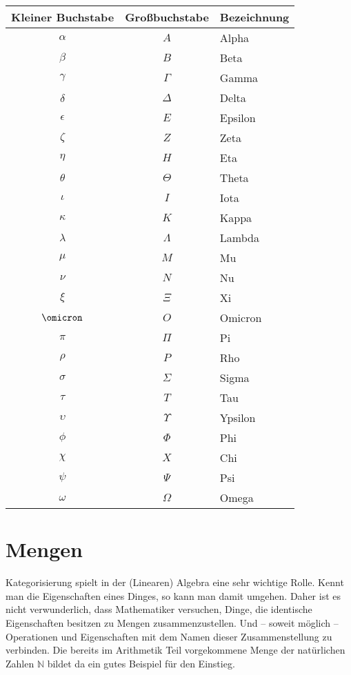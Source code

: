 \begin{center}
\begin{tabular}{c|c|l}
\hline
\textbf{Kleiner Buchstabe} & \textbf{Großbuchstabe} & \textbf{Bezeichnung} \\
\hline
$\alpha $ & $A $ & Alpha \\
$\beta $ & $B $ & Beta \\
$\gamma $ & $\Gamma $ & Gamma \\
$\delta $ & $\Delta $ & Delta \\
$\epsilon $ & $E $ & Epsilon \\
$\zeta $ & $Z $ & Zeta \\
$\eta $ & $H $ &  Eta\\
$\theta $ & $\Theta $ & Theta \\
$\iota $ & $I $ & Iota \\
$\kappa $ & $K $ & Kappa \\
$\lambda $ & $\Lambda $ & Lambda \\
$\mu $ & $M $ & Mu \\
$\nu $ & $N $ & Nu \\
$\xi $ & $\Xi $ &  Xi \\
$\omicron $ & $O $ & Omicron \\
$\pi $ & $\Pi $ & Pi \\
$\rho $ & $P $ & Rho \\
$\sigma $ & $\Sigma $ & Sigma  \\
$\tau $ & $T $ & Tau \\
$\upsilon $ & $\Upsilon $ & Ypsilon \\
$\phi $ & $\Phi $ & Phi \\
$\chi $ & $X $ & Chi \\
$\psi $ & $\Psi $ & Psi \\
$\omega $ & $\Omega $ & Omega \\
\hline
\end{tabular}
\end{center}


\section{Mengen}


Kategorisierung spielt in der (Linearen) Algebra eine sehr wichtige Rolle. Kennt man die Eigenschaften eines Dinges, so kann man damit umgehen. Daher ist es nicht verwunderlich, dass Mathematiker versuchen, Dinge, die identische Eigenschaften besitzen zu Mengen zusammenzustellen. Und -- soweit möglich -- Operationen und Eigenschaften mit dem Namen dieser Zusammenstellung zu verbinden. Die bereits im Arithmetik Teil vorgekommene Menge der natürlichen Zahlen $\mathbb{N}$ bildet da ein gutes Beispiel für den Einstieg. 

